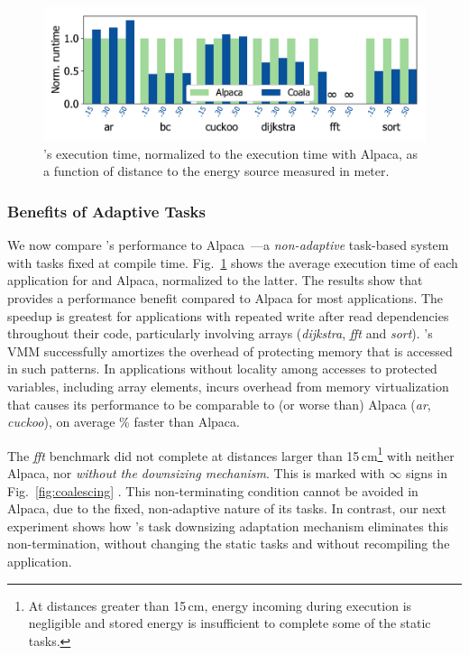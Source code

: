 \begin{figure}
	\includegraphics[width=\columnwidth]{figures/coala_alpaca_gcc}
    \caption{\sys's execution time, normalized to the execution time 
    with Alpaca, as a function of distance to the energy source 
    measured in meter.}
	\label{fig:runtime}
\end{figure}

\subsubsection{Benefits of Adaptive Tasks}
%
We now compare \sys's performance to Alpaca~\cite{alpaca}---a
\emph{non-adaptive} task-based system with tasks fixed at compile time.
Fig.~\ref{fig:runtime} shows the average execution time of each
application for \sys and Alpaca, normalized to the latter. The results show
that \sys provides a performance benefit compared to Alpaca for most
applications. The speedup is greatest for applications with repeated write after
read dependencies throughout their code, particularly involving arrays
(\textit{dijkstra}, \textit{fft} and \textit{sort}). \sys's VMM
successfully amortizes the overhead of protecting memory that is accessed in
such patterns.  In applications without locality among accesses to protected
variables, including array elements, \sys incurs overhead from memory
virtualization that causes its performance to be comparable to (or worse than)
Alpaca (\textit{ar}, \textit{cuckoo}), on average \% faster than Alpaca.

The \textit{fft} benchmark did not complete at distances larger than
15\,cm\footnote{At distances greater than 15\,cm, energy incoming during
execution is negligible and stored energy is insufficient to complete some of
the static tasks.} with neither Alpaca, nor \sys \emph{without the downsizing
mechanism}. This is marked with $\infty$ signs in Fig.~\ref{fig:coalescing}
. This non-terminating condition cannot be avoided in Alpaca, due to the
fixed, non-adaptive nature of its tasks.  In contrast, our next experiment
shows how \sys's task downsizing adaptation mechanism eliminates this
non-termination, without changing the static tasks and without recompiling the
application.

